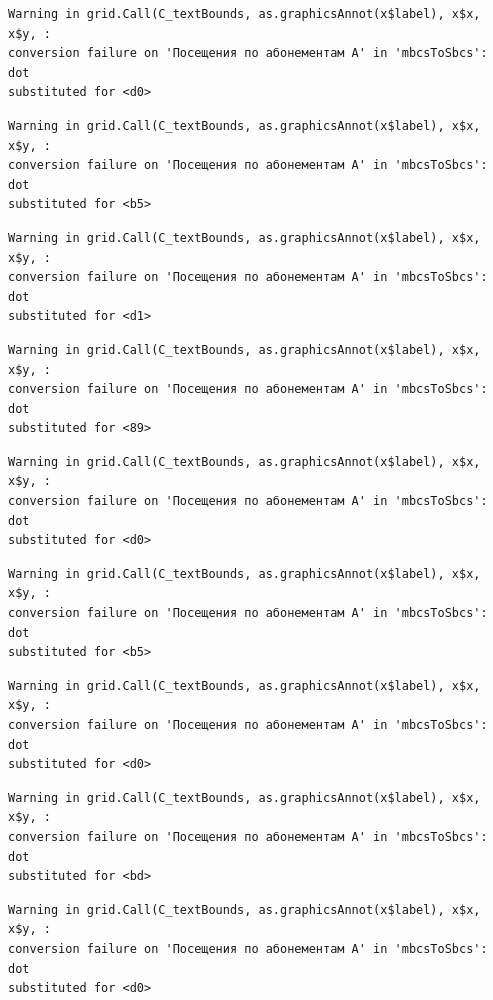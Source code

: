 \documentclass[
  letterpaper,
  DIV=11,
  numbers=noendperiod]{scrartcl}
\begin{document}
\begin{verbatim}
Warning in grid.Call(C_textBounds, as.graphicsAnnot(x$label), x$x, x$y, :
conversion failure on 'Посещения по абонементам А' in 'mbcsToSbcs': dot
substituted for <d0>
\end{verbatim}

\begin{verbatim}
Warning in grid.Call(C_textBounds, as.graphicsAnnot(x$label), x$x, x$y, :
conversion failure on 'Посещения по абонементам А' in 'mbcsToSbcs': dot
substituted for <b5>
\end{verbatim}

\begin{verbatim}
Warning in grid.Call(C_textBounds, as.graphicsAnnot(x$label), x$x, x$y, :
conversion failure on 'Посещения по абонементам А' in 'mbcsToSbcs': dot
substituted for <d1>
\end{verbatim}

\begin{verbatim}
Warning in grid.Call(C_textBounds, as.graphicsAnnot(x$label), x$x, x$y, :
conversion failure on 'Посещения по абонементам А' in 'mbcsToSbcs': dot
substituted for <89>
\end{verbatim}

\begin{verbatim}
Warning in grid.Call(C_textBounds, as.graphicsAnnot(x$label), x$x, x$y, :
conversion failure on 'Посещения по абонементам А' in 'mbcsToSbcs': dot
substituted for <d0>
\end{verbatim}

\begin{verbatim}
Warning in grid.Call(C_textBounds, as.graphicsAnnot(x$label), x$x, x$y, :
conversion failure on 'Посещения по абонементам А' in 'mbcsToSbcs': dot
substituted for <b5>
\end{verbatim}

\begin{verbatim}
Warning in grid.Call(C_textBounds, as.graphicsAnnot(x$label), x$x, x$y, :
conversion failure on 'Посещения по абонементам А' in 'mbcsToSbcs': dot
substituted for <d0>
\end{verbatim}

\begin{verbatim}
Warning in grid.Call(C_textBounds, as.graphicsAnnot(x$label), x$x, x$y, :
conversion failure on 'Посещения по абонементам А' in 'mbcsToSbcs': dot
substituted for <bd>
\end{verbatim}

\begin{verbatim}
Warning in grid.Call(C_textBounds, as.graphicsAnnot(x$label), x$x, x$y, :
conversion failure on 'Посещения по абонементам А' in 'mbcsToSbcs': dot
substituted for <d0>
\end{verbatim}
\end{document}
